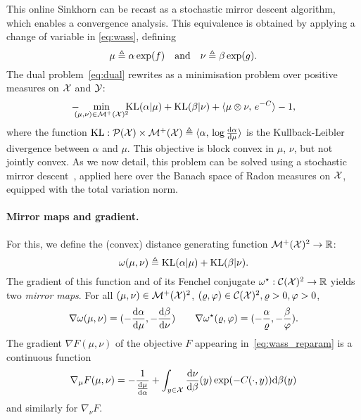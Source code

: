 This online Sinkhorn can be recast as a stochastic mirror descent algorithm, which enables a convergence analysis.
%
This equivalence is obtained by applying a change
of variable in \eqref{eq:wass}, defining 
\begin{equation}\label{eq-change-var}
	\mu \triangleq \alpha \exp(f)
	\quad \text{and} \quad 
	\nu \triangleq \beta \exp(g). 
\end{equation}
The dual problem~\eqref{eq:dual} 
rewrites as a minimisation problem over positive measures on $\mathcal{X}$ and $\mathcal{Y}$:
\begin{equation}\label{eq:wass_reparam}
    - \!\!\!\!\min_{(\mu,\nu) \in \mathcal{M}^+(\mathcal{X})^2} \!\!\!\textrm{KL}(\alpha | \mu)
    + \textrm{KL}(\beta | \nu) + \langle \mu \otimes \nu,\,e^{-C}\rangle - 1,
\end{equation}
where the function $\textrm{KL}: \mathcal{P}(\mathcal{X}) \times \mathcal{M}^+(\mathcal{X}) \triangleq \langle \alpha,\, \log \frac{\textrm{d} \alpha}{\textrm{d} \mu}\rangle$ is the Kullback-Leibler divergence between
$\alpha$ and $\mu$. 
%
This objective is block convex in $\mu$, $\nu$, but not jointly convex. 
%
As we now detail, this problem can be solved using a stochastic mirror descent~\cite{beck2003mirror}, applied here over the Banach space of Radon measures on $\mathcal{X}$, equipped with the total variation norm. 

\paragraph{Mirror maps and gradient.}

For this, we define the (convex) distance generating function $\mathcal{M}^+(\mathcal{X})^2 \to \mathbb{R}$:
\begin{equation}
    \omega(\mu, \nu) \triangleq \textrm{KL}(\alpha | \mu) + \textrm{KL}(\beta | \nu).
\end{equation}
The gradient of this function and of its Fenchel conjugate $\omega^\star:
\mathcal{C}(\mathcal{X})^2 \to \mathbb{R}$ yields two \textit{mirror maps}. For all $(\mu, \nu) \in
\mathcal{M}^+(\mathcal{X})^2$, $(\varrho, \varphi) \in \mathcal{C}(\mathcal{X})^2, \varrho > 0, \varphi > 0$,
\begin{equation}
    \nabla \omega(\mu, \nu) = (- \frac{\textrm{d} \alpha}{\textrm{d} \mu}, - \frac{\textrm{d} \beta}{\textrm{d} \nu} )
    \qquad \nabla \omega^\star(\varrho, \varphi)
     = (-\frac{\alpha}{\varrho}, -\frac{\beta}{\varphi}).
\end{equation}
The gradient $\nabla F(\mu, \nu)$ of the objective $F$ appearing
in~\eqref{eq:wass_reparam} is a continuous function
\begin{equation}
    \nabla_\mu F(\mu, \nu) = - \frac{1}{\frac{\textrm{d}\mu}{\textrm{d}\alpha}} + \int_{y \in \mathcal{X}}
    \frac{\textrm{d} \nu}{\textrm{d} \beta}(y) \exp(- C(\cdot, y)) \textrm{d} \beta(y)
\end{equation}
and similarly for $\nabla_\nu F$.

